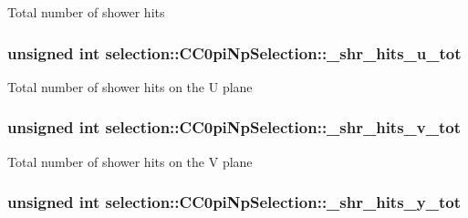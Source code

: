 Total number of shower hits \hypertarget{classselection_1_1CC0piNpSelection_afba4a31f84c2f125323b90f007bda1c6}{
\subsubsection[{\-\_\-shr\-\_\-hits\-\_\-u\-\_\-tot}]{\setlength{\rightskip}{0pt plus 5cm}unsigned int selection\-::\-C\-C0pi\-Np\-Selection\-::\-\_\-shr\-\_\-hits\-\_\-u\-\_\-tot\hspace{0.3cm}{\ttfamily [private]}}}\label{classselection_1_1CC0piNpSelection_afba4a31f84c2f125323b90f007bda1c6}
Total number of shower hits on the U plane \hypertarget{classselection_1_1CC0piNpSelection_ab6aaf4282fa9d2e5971e162c66901227}{
\subsubsection[{\-\_\-shr\-\_\-hits\-\_\-v\-\_\-tot}]{\setlength{\rightskip}{0pt plus 5cm}unsigned int selection\-::\-C\-C0pi\-Np\-Selection\-::\-\_\-shr\-\_\-hits\-\_\-v\-\_\-tot\hspace{0.3cm}{\ttfamily [private]}}}\label{classselection_1_1CC0piNpSelection_ab6aaf4282fa9d2e5971e162c66901227}
Total number of shower hits on the V plane \hypertarget{classselection_1_1CC0piNpSelection_a6a43c3523af47860ad1682ebe14bb8e3}{
\subsubsection[{\-\_\-shr\-\_\-hits\-\_\-y\-\_\-tot}]{\setlength{\rightskip}{0pt plus 5cm}unsigned int selection\-::\-C\-C0pi\-Np\-Selection\-::\-\_\-shr\-\_\-hits\-\_\-y\-\_\-tot\hspace{0.3cm}{\ttfamily [private]}}}\label{classselection_1_1CC0piNpSelection_a6a43c3523af47860ad1682ebe14bb8e3}
